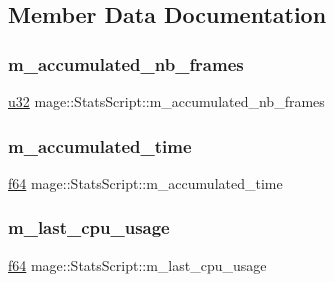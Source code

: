 \subsection{Member Data Documentation}
\hypertarget{classmage_1_1_stats_script_ab6b95146456616157183550428818427}{}\label{classmage_1_1_stats_script_ab6b95146456616157183550428818427} 
\subsubsection{\texorpdfstring{m\+\_\+accumulated\+\_\+nb\+\_\+frames}{m\_accumulated\_nb\_frames}}
{\footnotesize\ttfamily \hyperlink{namespacemage_af2b398bf98eb10351f49cad73fe2cc73}{u32} mage\+::\+Stats\+Script\+::m\+\_\+accumulated\+\_\+nb\+\_\+frames\hspace{0.3cm}{\ttfamily [private]}}

\hypertarget{classmage_1_1_stats_script_a01b747da488fb1f574ca6ccf1608d706}{}\label{classmage_1_1_stats_script_a01b747da488fb1f574ca6ccf1608d706} 
\subsubsection{\texorpdfstring{m\+\_\+accumulated\+\_\+time}{m\_accumulated\_time}}
{\footnotesize\ttfamily \hyperlink{namespacemage_ab935747c6941320bd6214b5a5f265b09}{f64} mage\+::\+Stats\+Script\+::m\+\_\+accumulated\+\_\+time\hspace{0.3cm}{\ttfamily [private]}}

\hypertarget{classmage_1_1_stats_script_a01cf9681c11ee035b70b85b2976a82c6}{}\label{classmage_1_1_stats_script_a01cf9681c11ee035b70b85b2976a82c6} 
\subsubsection{\texorpdfstring{m\+\_\+last\+\_\+cpu\+\_\+usage}{m\_last\_cpu\_usage}}
{\footnotesize\ttfamily \hyperlink{namespacemage_ab935747c6941320bd6214b5a5f265b09}{f64} mage\+::\+Stats\+Script\+::m\+\_\+last\+\_\+cpu\+\_\+usage\hspace{0.3cm}{\ttfamily [private]}}


